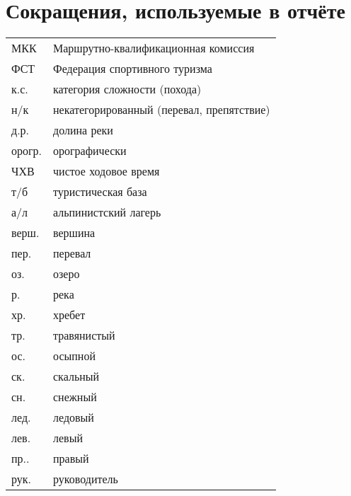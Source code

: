 \section*{Сокращения, используемые в отчёте}
\begin{tabular}{p{} p{}}
	МКК                                  &   Маршрутно-квалификационная комиссия  \\
	ФСТ                                &   Федерация спортивного туризма  \\
	к.с.                               &   категория сложности (похода)  \\
	н/к                            &   некатегорированный (перевал, препятствие) \\
	д.р.                            &   долина реки \\
	орогр.                &   орографически  \\
	ЧХВ                          &   чистое ходовое время  \\
	т/б                         &   туристическая база \\
	а/л                  &   альпинистский лагерь \\
	верш.               &   вершина \\
	пер.               &   перевал \\
	оз.             &   озеро \\
	р.             &   река \\
	хр. &   хребет \\
	тр. &   травянистый \\
	ос. &   осыпной \\
	ск. &   скальный \\
	сн. &   снежный \\
	лед. &   ледовый \\
	лев. &   левый \\
	пр..&   правый \\
	рук. &   руководитель \\	
\end{tabular}
\newpage